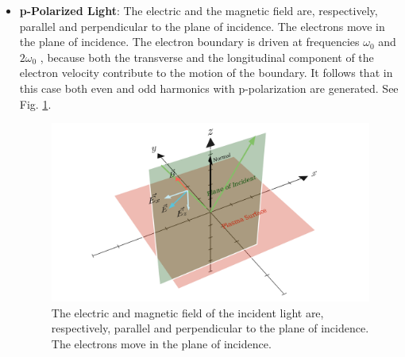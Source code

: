 \documentclass[12pt]{article}
\begin{document}
\begin{itemize}
    \item \textbf{p-Polarized Light}: The electric and the magnetic field are, respectively, parallel and perpendicular to the plane of incidence. The electrons move in the plane of incidence. The electron boundary is driven at frequencies $\omega_0$ and $2\omega_0$ , because both the transverse and the longitudinal component of the electron velocity contribute to the motion of the boundary. It follows that in this case both even and odd harmonics with p-polarization are generated. See Fig. \ref{fig:p-polarized}.
          \begin{figure}[h]
              \centering
              \includegraphics[width=1\textwidth]{images/p.png}
              \caption{The electric and magnetic field of the incident light are, respectively, parallel and perpendicular to the plane of incidence. The electrons move in the plane of incidence.}
              \label{fig:p-polarized}
          \end{figure}


\end{itemize}
\end{document}
